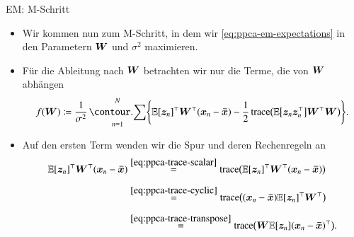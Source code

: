 \begin{frame}{EM: M-Schritt}{}
	\begin{itemize}
		\item Wir kommen nun zum M-Schritt, in dem wir \eqref{eq:ppca-em-expectations} in den Parametern
			$\bm{W}$ und $\sigma^2$ maximieren.
		\item Für die Ableitung nach $\bm{W}$ betrachten wir nur die Terme, die von $\bm{W}$ abhängen
		\begin{equation}
			f(\bW)
				\coloneqq \frac{1}{\sigma^2} \sum_{n=1}^N \Biggl\{
					\E[\bz_n]^\top \bW^\top (\bx_n - \bxmean)
					- \frac{1}{2} \trace\bigl( \E\bigl[ \bz_n \bz_n^\top \bigr] \bW^\top \bW \bigr)
				\Biggr\}.
		\end{equation}
		\item Auf den ersten Term wenden wir die Spur und deren Rechenregeln an
		\begin{equation}
			\begin{aligned}
				\E[\bz_n]^\top \bW^\top (\bx_n - \bxmean)
					&\overset{\eqref{eq:ppca-trace-scalar}}{=} \trace\bigl( \E[\bz_n]^\top \bW^\top (\bx_n - \bxmean) \bigr)
			\\[2mm]
					&\overset{\eqref{eq:ppca-trace-cyclic}}{=} \trace\bigl( (\bx_n - \bxmean) \E[\bz_n]^\top \bW^\top \bigr)
			\\[2mm]
					&\overset{\eqref{eq:ppca-trace-transpose}}{=} \trace\bigl( \bW \E[\bz_n] (\bx_n - \bxmean)^\top \bigr).
			\end{aligned}
		\end{equation}
	\end{itemize}
\end{frame}


